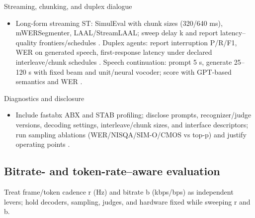 \documentclass{article}
\begin{document}
Streaming, chunking, and duplex dialogue
\begin{itemize}
  \item Long-form streaming ST: SimulEval with chunk sizes (320/640 ms), mWERSegmenter, LAAL/StreamLAAL; sweep delay k and report latency--quality frontiers/schedules \cite{guo2025streamuniachievingstreamingspeechtransla,zhao2024textlessstreamingspeechtranslationsemant}. Duplex agents: report interruption P/R/F1, WER on generated speech, first-response latency under declared interleave/chunk schedules \cite{ma2024languagemodelcanlistenwhilespeaking,cui2025thinkbeforeyoutalkenhancingmeaningfuldia,hu2025salmduplexefficientdirectmodelingspeechl}. Speech continuation: prompt 5 s, generate 25--120 s with fixed beam and unit/neural vocoder; score with GPT-based semantics and WER \cite{nakata2024jchatjapaneselargescalespokendialoguecor,cui2025thinkbeforeyoutalkenhancingmeaningfuldia}.
\end{itemize}

Diagnostics and disclosure
\begin{itemize}
  \item Include fastabx ABX and STAB profiling; disclose prompts, recognizer/judge versions, decoding settings, interleave/chunk sizes, and interface descriptors; run sampling ablations (WER/NISQA/SIM-O/CMOS vs top-p) and justify operating points \cite{poli2025fastabxlibraryefficientcomputationabxdis,vashishth2024stabspeechtokenizerassessmentbenchmark,nguyen2025qwenvsgemmaintegrationwhispercomparative,li2024investigatingneuralaudiocodecsspeechlang}.
\end{itemize}

\subsection{Bitrate- and token-rate--aware evaluation} \label{subsec:bitrate-andtoken-rate--awareevaluation}
Treat frame/token cadence r (Hz) and bitrate b (kbps/bps) as independent levers; hold decoders, sampling, judges, and hardware fixed while sweeping r and b.
\end{document}
